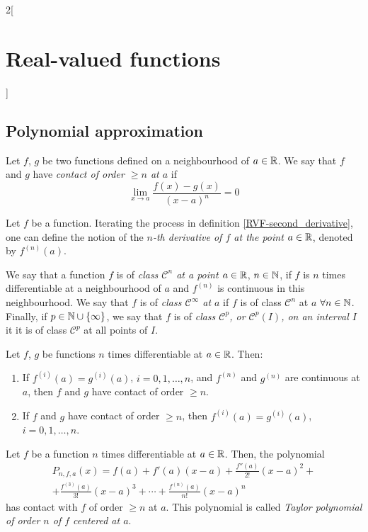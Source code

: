 \documentclass[../../../main.tex]{subfiles}
\begin{document}
\begin{multicols}{2}[\section{Real-valued functions}]
\subsection{Polynomial approximation}
\begin{definition}
    Let $f$, $g$ be two functions defined on a neighbourhood of $a\in\mathbb{R}$.  We say that $f$ and $g$ have \textit{contact of order $\geq n$ at $a$} if $$\lim_{x\to a}\frac{f(x)-g(x)}{{(x-a)}^n}=0$$
\end{definition}
\begin{definition}
    Let $f$ be a function. Iterating the process in definition \ref{RVF-second_derivative}, one can define the notion of the \textit{$n$-th derivative of $f$ at the point $a\in\mathbb{R}$}, denoted by $f^{(n)}(a)$. 
\end{definition}
\begin{definition}
    We say that a function $f$ is of \textit{class $\mathcal{C}^n$ at a point $a\in\mathbb{R}$}, $n\in\mathbb{N}$, if $f$ is $n$ times differentiable at a neighbourhood of $a$ and $f^{(n)}$ is continuous in this neighbourhood. We say that $f$ is of \textit{class $\mathcal{C}^\infty$ at $a$} if $f$ is of class $\mathcal{C}^n$ at $a$ $\forall n\in\mathbb{N}$. Finally, if $p\in\mathbb{N}\cup\{\infty\}$, we say that $f$ is of \textit{class $\mathcal{C}^p$, or $\mathcal{C}^p(I)$, on an interval $I$} it it is of class $\mathcal{C}^p$ at all points of $I$.
\end{definition}
\begin{lemma}
    Let $f$, $g$ be functions $n$ times differentiable at $a\in\mathbb{R}$. Then:
    \begin{enumerate}
        \item If $f^{(i)}(a)=g^{(i)}(a)$, $i=0,1,\ldots,n$, and $f^{(n)}$ and $g^{(n)}$ are continuous at $a$, then $f$ and $g$ have contact of order $\geq n$.
        \item If $f$ and $g$ have contact of order $\geq n$, then $f^{(i)}(a)=g^{(i)}(a)$, $i=0,1,\ldots,n$. 
    \end{enumerate}
\end{lemma}
\begin{theorem}
    Let $f$ be a function $n$ times differentiable at $a\in\mathbb{R}$. Then, the polynomial
    \begin{multline*}
        P_{n,f,a}(x)=f(a)+f'(a)(x-a)+\frac{f''(a)}{2!}{(x-a)}^2+\\+\frac{f^{(3)}(a)}{3!}{(x-a)}^3+\cdots+\frac{f^{(n)}(a)}{n!}{(x-a)}^n
    \end{multline*} 
    has contact with $f$ of order $\geq n$ at $a$. This polynomial is called \textit{Taylor polynomial of order $n$ of $f$ centered at $a$}.

\end{theorem}
\end{multicols}
\end{document}
